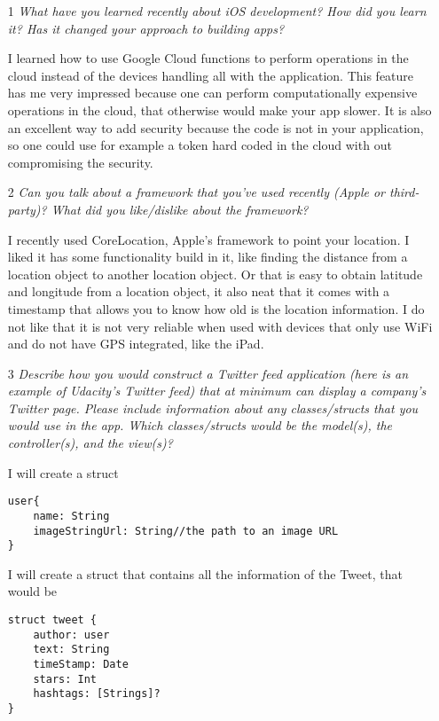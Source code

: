 \documentclass[12]{report}
\begin{document}
\begin{itemize}
\item[1] {\it What have you learned recently about iOS development? How did you learn it? Has it changed your approach to building apps? }

I learned how to use Google Cloud functions to perform operations in the cloud instead of the devices handling all with the application. This feature has me very impressed because one can perform computationally expensive operations in the cloud, that otherwise would make your app slower. It is also an excellent way to add security because the code is not in your application, so one could use for example a token hard coded in the cloud with out compromising the security. 
\item[2] {\it Can you talk about a framework that you've used recently (Apple or third-party)? What did you like/dislike about the framework?}

I recently used CoreLocation, Apple's framework to point your location. I liked it has some functionality build in it, like finding the distance from a location object to another location object.  Or that is easy to obtain latitude and longitude from a location object, it also neat that it comes with a timestamp that allows you to know how old is the location information. I do not like that it is not very reliable when used with devices that only use WiFi and do not have GPS integrated, like the iPad.

\item[3] {\it Describe how you would construct a Twitter feed application (here is an example of Udacity's Twitter feed) that at minimum can display a company's Twitter page. Please include information about any classes/structs that you would use in the app. Which classes/structs would be the model(s), the controller(s), and the view(s)?}

I will create a struct 
\begin{verbatim}
user{ 
    name: String 
    imageStringUrl: String//the path to an image URL              
}
\end{verbatim}

I will create a struct that contains all the information of the Tweet, that would be 

\begin{verbatim}
struct tweet { 
    author: user
    text: String 
    timeStamp: Date
    stars: Int
    hashtags: [Strings]?  
}
\end{verbatim}


\end{itemize}
\end{document}
